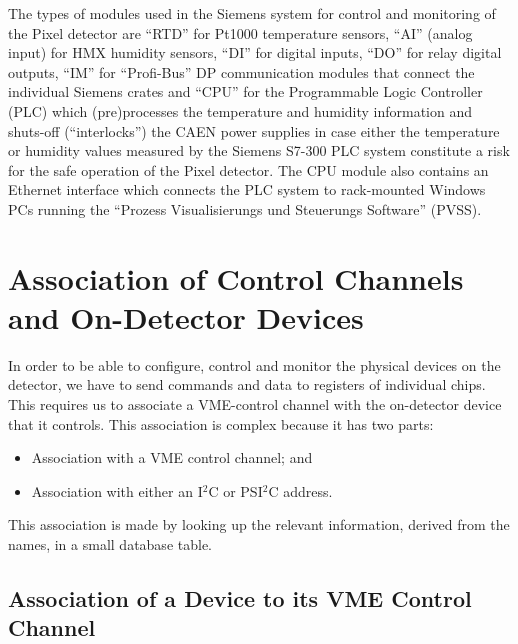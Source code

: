 \documentclass{cmspaper}
\begin{document}
The types of modules used in the Siemens system for control and monitoring of the Pixel detector 
are ``RTD'' for Pt1000 temperature sensors, ``AI'' (analog input) for HMX humidity sensors,
``DI'' for digital inputs, ``DO'' for relay digital outputs,
``IM'' for ``Profi-Bus'' DP communication modules that connect the individual Siemens crates
and ``CPU'' for the Programmable Logic Controller (PLC)  which (pre)processes the temperature and humidity information 
and shuts-off (``interlocks'') the CAEN power supplies in case either the temperature or humidity values measured by the Siemens S7-300 PLC system
constitute a risk for the safe operation of the Pixel detector.
The CPU module also contains an Ethernet interface which connects the PLC system to rack-mounted Windows PCs
running the ``Prozess Visualisierungs und Steuerungs Software'' (PVSS).


\section{Association of Control Channels and On-Detector Devices}

In order to be able to configure, control and monitor the physical devices
on the detector, we have to send commands and data to registers of individual 
chips. This requires us to associate a VME-control channel with the
on-detector device that it controls.
This association is complex because it has two parts:
\begin{itemize}
\item Association with a VME control channel; and
\item Association with either an I$^{2}$C or PSI$^{2}$C address.
\end{itemize}

This association is made by looking up the relevant information, derived from
the names, in a small database table.



\subsection{Association of a Device to its VME Control Channel}
\end{document}
